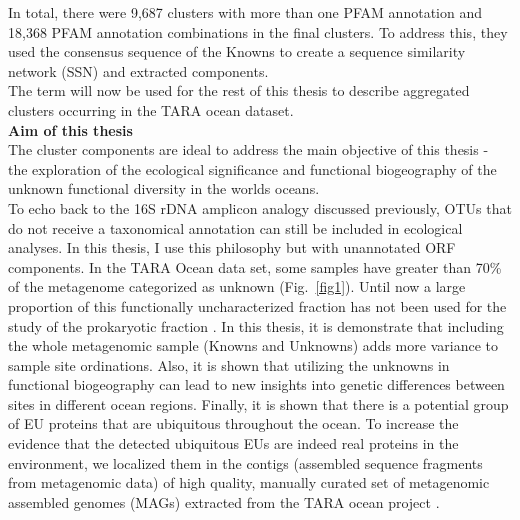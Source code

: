 In total, there were 9,687 clusters with more than one PFAM annotation and 18,368 PFAM annotation combinations in the final clusters. To address this, they used the consensus sequence of the Knowns to create a sequence similarity network (SSN) and extracted components.\\

The term  will now be used for the rest of this thesis to describe aggregated clusters occurring in the TARA ocean dataset.\\

\textbf{Aim of this thesis}\\

The cluster components are ideal to address the main objective of this thesis - the exploration of the ecological significance and functional biogeography of the unknown functional diversity in the world\textquotesingle s oceans.\\

To echo back to the 16S rDNA amplicon analogy discussed previously, OTUs that do not receive a taxonomical annotation can still be included in ecological analyses. In this thesis, I use this philosophy but with unannotated ORF components. In the TARA Ocean data set, some samples have greater than 70\% of the metagenome categorized as unknown (Fig.~\ref{fig1}). Until now a large proportion of this functionally uncharacterized fraction has not been used for the study of the prokaryotic fraction \citep{Roux_2015}. In this thesis, it is demonstrate that including the whole metagenomic sample (Knowns and Unknowns) adds more variance to sample site ordinations. Also, it is shown that utilizing the unknowns in functional biogeography can lead to new insights into genetic differences between sites in different ocean regions. Finally, it is shown that there is a potential group of EU proteins that are ubiquitous throughout the ocean. To increase the evidence that the detected ubiquitous EUs are indeed real proteins in the environment, we localized them in the contigs (assembled sequence fragments from metagenomic data) of high quality, manually curated set of metagenomic assembled genomes (MAGs) extracted from the TARA ocean project \citep{Delmont_2017}. \\
